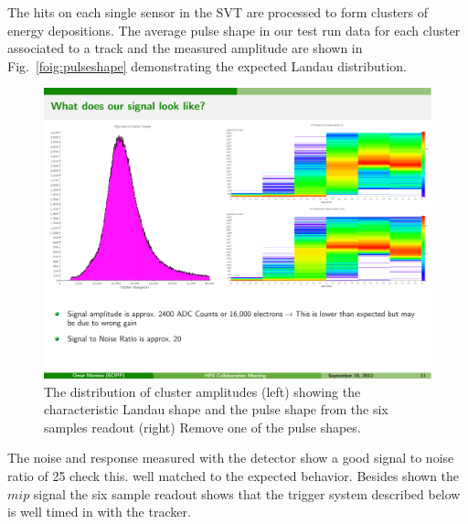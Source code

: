 The hits on each single sensor in the SVT are processed to form clusters of energy depositions. 
The average pulse shape in our test run data for each cluster associated to a track and the 
measured amplitude are shown in Fig.~\ref{foig:pulseshape} demonstrating 
the expected Landau distribution. 
\begin{figure}[]
	\includegraphics[width=\textwidth]{test2012/svtperformance/pulseshape_and_landau}
	\caption{\small{The distribution of cluster amplitudes (left) showing the characteristic Landau 
	shape and the pulse shape from the six samples readout (right) {\color{red} Remove one of the pulse shapes}. }}
	\label{fig:pulseshape}
\end{figure}

The noise and response measured with the detector show a good signal to noise ratio of 25 
{\color{red} check this.} well matched to the expected behavior. Besides shown the $mip$ 
signal the six sample readout shows that the trigger system described below is well timed in 
with the tracker. 

